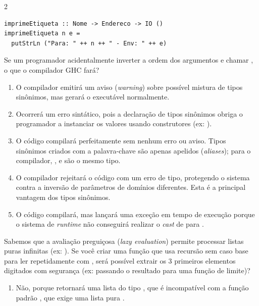 \documentclass[a4paper,10pt,brazil]{article}
\begin{document}
\begin{multicols}{2}
\begin{verbatim}
imprimeEtiqueta :: Nome -> Endereco -> IO ()
imprimeEtiqueta n e =
  putStrLn ("Para: " ++ n ++ " - Env: " ++ e)
\end{verbatim}

Se um programador acidentalmente inverter a ordem dos argumentos e chamar , o que o compilador GHC fará?

\begin{enumerate}
  \item O compilador emitirá um aviso (\emph{warning}) sobre possível mistura de tipos sinônimos, mas gerará o executável normalmente.

  \item Ocorrerá um erro sintático, pois a declaração de tipos sinônimos obriga o programador a instanciar os valores usando construtores (ex: ).

  \item O código compilará perfeitamente sem nenhum erro ou aviso. Tipos sinônimos criados com a palavra-chave  são apenas apelidos (\emph{aliases}); para o compilador, ,  e  são o mesmo tipo.

  \item O compilador rejeitará o código com um erro de tipo, protegendo o sistema contra a inversão de parâmetros de domínios diferentes. Esta é a principal vantagem dos tipos sinônimos.

  \item O código compilará, mas lançará uma exceção em tempo de execução porque o sistema de \emph{runtime} não conseguirá realizar o \emph{cast} de  para .


\end{enumerate}

Sabemos que a avaliação preguiçosa (\emph{lazy evaluation}) permite processar listas puras infinitas (ex: ). 
Se você criar uma função  que usa recursão sem caso base para ler repetidamente com , será possível extrair os 3 primeiros elementos digitados com segurança (ex: passando o resultado para uma função de limite)?

\begin{enumerate}
  \item Não, porque  retornará uma lista do tipo \haskellinline{[IO String]}, que é incompatível com a função padrão , que exige uma lista pura \haskellinline{[a]}.


\end{enumerate}
\end{multicols}
\end{document}
